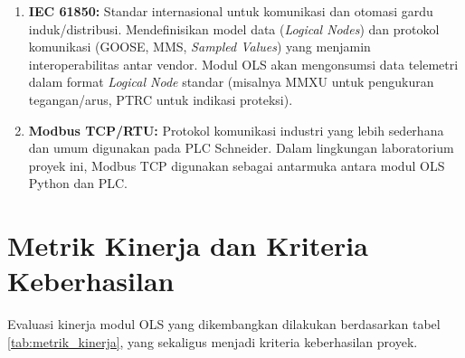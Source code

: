 \begin{enumerate}
    \item[a.] \textbf{IEC 61850:} Standar internasional untuk komunikasi dan otomasi gardu induk/distribusi. Mendefinisikan model data (\textit{Logical Nodes}) dan protokol komunikasi (GOOSE, MMS, \textit{Sampled Values}) yang menjamin interoperabilitas antar vendor. Modul OLS akan mengonsumsi data telemetri dalam format \textit{Logical Node} standar (misalnya MMXU untuk pengukuran tegangan/arus, PTRC untuk indikasi proteksi).
    
    \item[b.] \textbf{Modbus TCP/RTU:} Protokol komunikasi industri yang lebih sederhana dan umum digunakan pada PLC Schneider. Dalam lingkungan laboratorium proyek ini, Modbus TCP digunakan sebagai antarmuka antara modul OLS Python dan PLC.
\end{enumerate}

\section{Metrik Kinerja dan Kriteria Keberhasilan}
\label{sec:Metrik_Kinerja}

Evaluasi kinerja modul OLS yang dikembangkan dilakukan berdasarkan tabel \ref{tab:metrik_kinerja}, yang sekaligus menjadi kriteria keberhasilan proyek.

